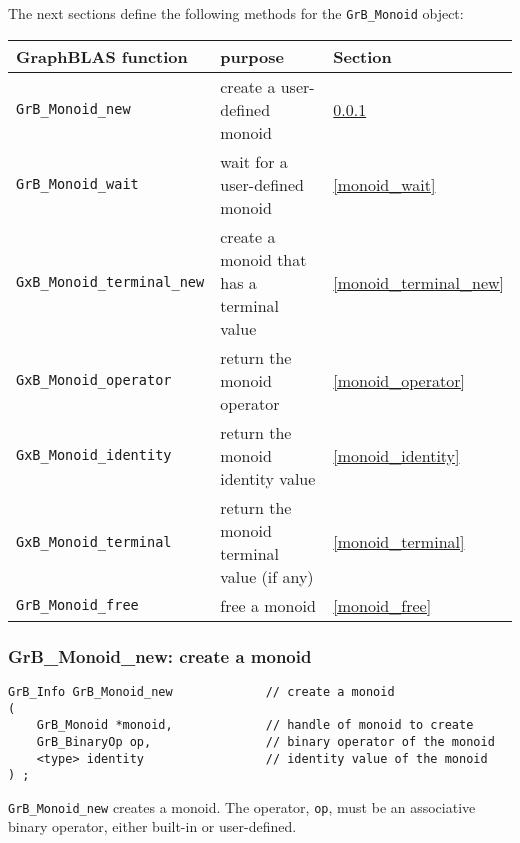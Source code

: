 \documentclass[12pt]{article}
\begin{document}
The next sections define the following methods for the \verb'GrB_Monoid'
object:

\vspace{0.2in}
{\footnotesize
\begin{tabular}{lll}
GraphBLAS function   & purpose                                      & Section \\
\hline
\verb'GrB_Monoid_new'       & create a user-defined monoid                  & \ref{monoid_new} \\
\verb'GrB_Monoid_wait'      & wait for a user-defined monoid                & \ref{monoid_wait} \\
\verb'GxB_Monoid_terminal_new'  & create a monoid that has a terminal value & \ref{monoid_terminal_new} \\
\verb'GxB_Monoid_operator'  & return the monoid operator                    & \ref{monoid_operator} \\
\verb'GxB_Monoid_identity'  & return the monoid identity value              & \ref{monoid_identity} \\
\verb'GxB_Monoid_terminal'  & return the monoid terminal value (if any)     & \ref{monoid_terminal} \\
\verb'GrB_Monoid_free'      & free a monoid                                 & \ref{monoid_free} \\
\hline
\end{tabular}
}
\vspace{0.2in}

\newpage
\subsubsection{{\sf GrB\_Monoid\_new:} create a monoid}
\label{monoid_new}

\begin{mdframed}[userdefinedwidth=6in]
{\footnotesize
\begin{verbatim}
GrB_Info GrB_Monoid_new             // create a monoid
(
    GrB_Monoid *monoid,             // handle of monoid to create
    GrB_BinaryOp op,                // binary operator of the monoid
    <type> identity                 // identity value of the monoid
) ;
\end{verbatim}
} \end{mdframed}

\verb'GrB_Monoid_new' creates a monoid.  The operator, \verb'op', must be an
associative binary operator, either built-in or user-defined.
\end{document}
